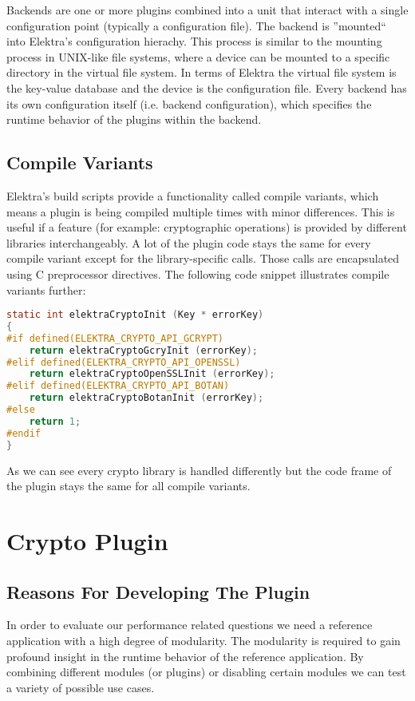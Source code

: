 Backends are one or more plugins combined into a unit that interact with a single configuration point (typically a configuration file).
The backend is ''mounted`` into Elektra's configuration hierachy.
This process is similar to the mounting process in UNIX-like file systems, where a device can be mounted to a specific directory in the virtual file system.
In terms of Elektra the virtual file system is the key-value database and the device is the configuration file.
Every backend has its own configuration itself (i.e. backend configuration), which specifies the runtime behavior of the plugins within the backend.

\subsection{Compile Variants}

Elektra's build scripts provide a functionality called compile variants, which means a plugin is being compiled multiple times with minor differences.
This is useful if a feature (for example: cryptographic operations) is provided by different libraries interchangeably.
A lot of the plugin code stays the same for every compile variant except for the library-specific calls.
Those calls are encapsulated using C preprocessor directives.
The following code snippet illustrates compile variants further:

\begin{lstlisting}[language=C]
static int elektraCryptoInit (Key * errorKey)
{
#if defined(ELEKTRA_CRYPTO_API_GCRYPT)
	return elektraCryptoGcryInit (errorKey);
#elif defined(ELEKTRA_CRYPTO_API_OPENSSL)
	return elektraCryptoOpenSSLInit (errorKey);
#elif defined(ELEKTRA_CRYPTO_API_BOTAN)
	return elektraCryptoBotanInit (errorKey);
#else
	return 1;
#endif
}
\end{lstlisting}

As we can see every crypto library is handled differently but the code frame of the plugin stays the same for all compile variants.

\section{Crypto Plugin}\label{crypto-plugin}

\subsection{Reasons For Developing The Plugin}

In order to evaluate our performance related questions we need a reference application with a high degree of modularity.
The modularity is required to gain profound insight in the runtime behavior of the reference application.
By combining different modules (or plugins) or disabling certain modules we can test a variety of possible use cases.

